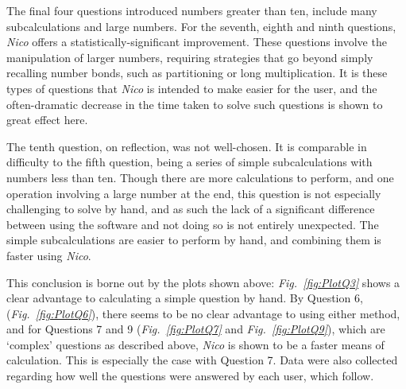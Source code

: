 \documentclass[12pt,twoside,notitlepage,xetex]{report}
\begin{document}
The final four questions introduced numbers greater than ten, include many subcalculations and large numbers.  For the seventh, eighth and ninth questions, \emph{Nico} offers a statistically-significant improvement.  These questions involve the manipulation of larger numbers, requiring strategies that go beyond simply recalling number bonds, such as partitioning or long multiplication.  It is these types of questions that \emph{Nico} is intended to make easier for the user, and the often-dramatic decrease in the time taken to solve such questions is shown to great effect here.

The tenth question, on reflection, was not well-chosen.  It is comparable in difficulty to the fifth question, being a series of simple subcalculations with numbers less than ten.  Though there are more calculations to perform, and one operation involving a large number at the end,  this question is not especially challenging to solve by hand, and as such the lack of a significant difference between using the software and not doing so is not entirely unexpected.  The simple subcalculations are easier to perform by hand, and combining them is faster using \emph{Nico}.

This conclusion is borne out by the plots shown above: \emph{Fig.~\ref{fig:PlotQ3}} shows a clear advantage to calculating a simple question by hand.  By Question 6, (\emph{Fig.~\ref{fig:PlotQ6}}), there seems to be no clear advantage to using either method, and for Questions 7 and 9 (\emph{Fig.~\ref{fig:PlotQ7}} and \emph{Fig.~\ref{fig:PlotQ9}}), which are `complex' questions as described above, \emph{Nico} is shown to be a faster means of calculation.  This is especially the case with Question 7.  Data were also collected regarding how well the questions were answered by each user, which follow.
\end{document}
